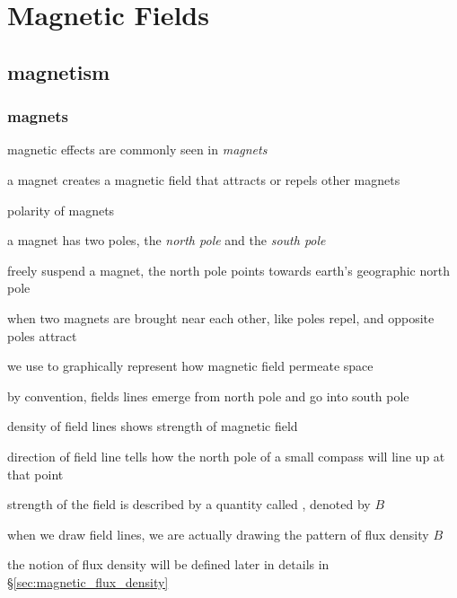 \section{Magnetic Fields}

\subsection{magnetism}

\subsubsection{magnets}

magnetic effects are commonly seen in \emph{magnets}

a magnet creates a magnetic field that attracts or repels other magnets

\cmt polarity of magnets

a magnet has two poles, the \emph{north pole} and the \emph{south pole}

freely suspend a magnet, the north pole points towards earth's geographic north pole

when two magnets are brought near each other, like poles repel, and opposite poles attract

\cmt we use  to graphically represent how magnetic field permeate space

by convention, fields lines emerge from north pole and go into south pole

density of field lines shows strength of magnetic field

direction of field line tells how the north pole of a small compass will line up at that point

\cmt strength of the field is described by a quantity called , denoted by $B$

when we draw field lines, we are actually drawing the pattern of flux density $B$

the notion of flux density will be defined later in details in \S\ref{sec:magnetic_flux_density}


